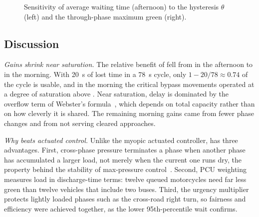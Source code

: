 \begin{figure}[htbp]
\centering
{}
\caption{Sensitivity of \prism{} average waiting time (afternoon) to the hysteresis $\theta$ (left) and the through-phase maximum green (right).}
\label{fig:eval-param}
\end{figure}

\subsection{Discussion}\label{sec:eval-discussion}

\textit{Gains shrink near saturation.} The relative benefit of \prism{} fell from  in the afternoon to  in the morning. With 20~s of lost time in a 78~s cycle, only $1 - 20/78 \approx 0.74$ of the cycle is usable, and in the morning the critical bypass movements operated at a degree of saturation above . Near saturation, delay is dominated by the overflow term of Webster's formula~\cite{webster1958}, which depends on total capacity rather than on how cleverly it is shared. The remaining morning gains came from fewer phase changes and from not serving cleared approaches.

\textit{Why \prism{} beats actuated control.} Unlike the myopic actuated controller, \prism{} has three advantages. First, cross-phase pressure terminates a phase when another phase has accumulated a larger load, not merely when the current one runs dry, the property behind the stability of max-pressure control~\cite{varaiya2013maxpressure}. Second, PCU weighting measures load in discharge-time terms: twelve queued motorcycles need far less green than twelve vehicles that include two buses. Third, the urgency multiplier protects lightly loaded phases such as the cross-road right turn, so fairness and efficiency were achieved together, as the lower 95th-percentile wait confirms.

